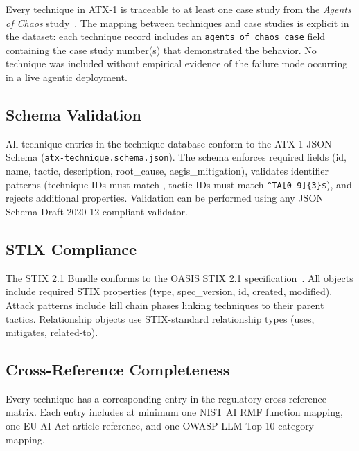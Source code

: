 \documentclass{IEEEoj-data}
\begin{document}
Every technique in ATX-1 is traceable to at least one case study from the {\it Agents of Chaos} study~\cite{ref4}. The mapping between techniques and case studies is explicit in the dataset: each technique record includes an \texttt{agents\_of\_chaos\_case} field containing the case study number(s) that demonstrated the behavior. No technique was included without empirical evidence of the failure mode occurring in a live agentic deployment.

\subsection*{Schema Validation}

All technique entries in the technique database conform to the ATX-1 JSON Schema (\texttt{atx-technique.schema.json}). The schema enforces required fields (id, name, tactic, description, root\_cause, aegis\_mitigation), validates identifier patterns (technique IDs must match , tactic IDs must match \texttt{\^{}TA[0-9]\{3\}\$}), and rejects additional properties. Validation can be performed using any JSON Schema Draft 2020-12 compliant validator.

\subsection*{STIX Compliance}

The STIX 2.1 Bundle conforms to the OASIS STIX 2.1 specification~\cite{ref7}. All objects include required STIX properties (type, spec\_version, id, created, modified). Attack patterns include kill chain phases linking techniques to their parent tactics. Relationship objects use STIX-standard relationship types (uses, mitigates, related-to).

\subsection*{Cross-Reference Completeness}

Every technique has a corresponding entry in the regulatory cross-reference matrix. Each entry includes at minimum one NIST AI RMF function mapping, one EU AI Act article reference, and one OWASP LLM Top 10 category mapping.

\subsection*{}
\end{document}
